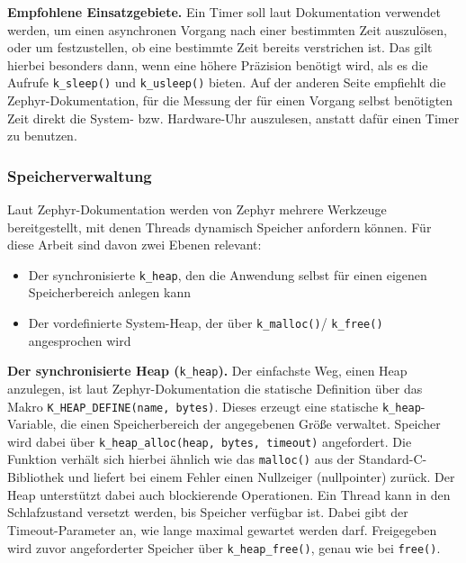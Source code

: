 \textbf{Empfohlene Einsatzgebiete.} Ein Timer soll laut Dokumentation verwendet werden, um einen asynchronen Vorgang nach einer bestimmten Zeit auszul{\"o}sen, oder um festzustellen, ob eine bestimmte Zeit bereits verstrichen ist. Das gilt hierbei besonders dann, wenn eine h{\"o}here Pr{\"a}zision ben{\"o}tigt wird, als es die Aufrufe \lstinline[style=fileinline]|k_sleep()| und \lstinline[style=fileinline]|k_usleep()| bieten. Auf der anderen Seite empfiehlt die Zephyr-Dokumentation, f{\"u}r die Messung der f{\"u}r einen Vorgang selbst ben{\"o}tigten Zeit direkt die System- bzw. Hardware-Uhr auszulesen, anstatt daf{\"u}r einen Timer zu benutzen.

\subsubsection{Speicherverwaltung}
Laut Zephyr-Dokumentation werden von Zephyr mehrere Werkzeuge bereitgestellt, mit denen Threads dynamisch Speicher anfordern k{\"o}nnen. F{\"u}r diese Arbeit sind davon zwei Ebenen relevant:

\begin{itemize}
\item Der synchronisierte \lstinline[style=fileinline]|k_heap|, den die Anwendung selbst f{\"u}r einen eigenen Speicherbereich anlegen kann
\item Der vordefinierte System-Heap, der {\"u}ber \lstinline[style=fileinline]|k_malloc()|/ \lstinline[style=fileinline]|k_free()| angesprochen wird
\end{itemize}
\textbf{Der synchronisierte Heap (}\lstinline[style=fileinline]|k_heap|\textbf{).} Der einfachste Weg, einen Heap anzulegen, ist laut Zephyr-Dokumentation die statische Definition {\"u}ber das Makro \lstinline[style=fileinline]|K_HEAP_DEFINE(name, bytes)|. Dieses erzeugt eine statische \lstinline[style=fileinline]|k_heap|-Variable, die einen Speicherbereich der angegebenen Gr{\"o}{\ss}e verwaltet. Speicher wird dabei {\"u}ber \lstinline[style=fileinline]|k_heap_alloc(heap, bytes, timeout)| angefordert. Die Funktion verh{\"a}lt sich hierbei {\"a}hnlich wie das \lstinline[style=fileinline]|malloc()| aus der Standard-C-Bibliothek und liefert bei einem Fehler einen Nullzeiger (nullpointer) zur{\"u}ck. Der Heap unterst{\"u}tzt dabei auch blockierende Operationen. Ein Thread kann in den Schlafzustand versetzt werden, bis Speicher verf{\"u}gbar ist. Dabei gibt der Timeout-Parameter an, wie lange maximal gewartet werden darf. Freigegeben wird zuvor angeforderter Speicher {\"u}ber \lstinline[style=fileinline]|k_heap_free()|, genau wie bei \lstinline[style=fileinline]|free()|.

